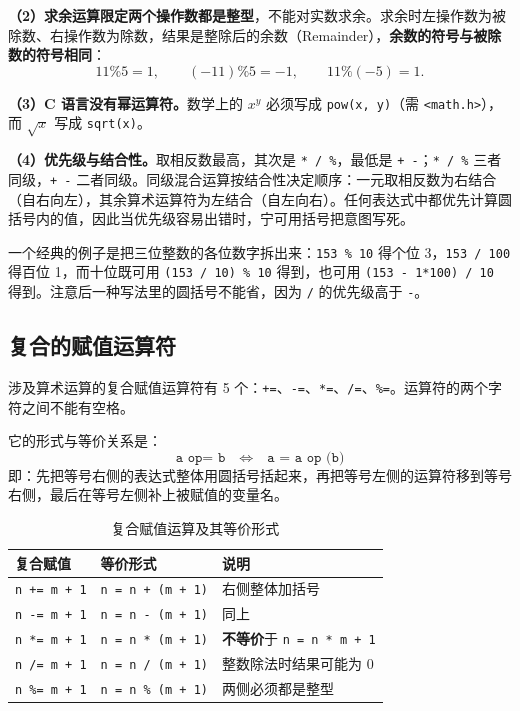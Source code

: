 \textbf{（2）求余运算限定两个操作数都是整型}，不能对实数求余。求余时左操作数为被除数、右操作数为除数，结果是整除后的余数（Remainder），\textbf{余数的符号与被除数的符号相同}：
\[
11\%5=1,\qquad (-11)\%5=-1,\qquad 11\%(-5)=1 .
\]

\textbf{（3）C 语言没有幂运算符。}数学上的 $x^y$ 必须写成 \texttt{pow(x, y)}（需 \texttt{<math.h>}），而 $\sqrt{x}$ 写成 \texttt{sqrt(x)}。

\textbf{（4）优先级与结合性。}取相反数最高，其次是 \texttt{* / \%}，最低是 \texttt{+ -}；\texttt{* / \%} 三者同级，\texttt{+ -} 二者同级。同级混合运算按结合性决定顺序：一元取相反数为右结合（自右向左），其余算术运算符为左结合（自左向右）。任何表达式中都优先计算圆括号内的值，因此当优先级容易出错时，宁可用括号把意图写死。

一个经典的例子是把三位整数的各位数字拆出来：\texttt{153 \% 10} 得个位 3，\texttt{153 / 100} 得百位 1，而十位既可用 \texttt{(153 / 10) \% 10} 得到，也可用 \texttt{(153 - 1*100) / 10} 得到。注意后一种写法里的圆括号不能省，因为 \texttt{/} 的优先级高于 \texttt{-}。

\subsection{复合的赋值运算符}

涉及算术运算的复合赋值运算符有 5 个：\texttt{+=}、\texttt{-=}、\texttt{*=}、\texttt{/=}、\texttt{\%=}。运算符的两个字符之间不能有空格。

它的形式与等价关系是：
\[
\texttt{a\ op=\ b}\quad\Longleftrightarrow\quad \texttt{a = a\ op\ (b)}
\]
即：先把等号右侧的表达式整体用圆括号括起来，再把等号左侧的运算符移到等号右侧，最后在等号左侧补上被赋值的变量名。

\begin{table}[htbp]
\centering
\caption{复合赋值运算及其等价形式}
\small
\begin{tabularx}{\textwidth}{@{}llX@{}}
\toprule
复合赋值 & 等价形式 & 说明 \\
\midrule
\texttt{n += m + 1} & \texttt{n = n + (m + 1)} & 右侧整体加括号 \\
\texttt{n -= m + 1} & \texttt{n = n - (m + 1)} & 同上 \\
\texttt{n *= m + 1} & \texttt{n = n * (m + 1)} & \textbf{不等价}于 \texttt{n = n * m + 1} \\
\texttt{n /= m + 1} & \texttt{n = n / (m + 1)} & 整数除法时结果可能为 0 \\
\texttt{n \%= m + 1} & \texttt{n = n \% (m + 1)} & 两侧必须都是整型 \\
\bottomrule
\end{tabularx}
\end{table}

